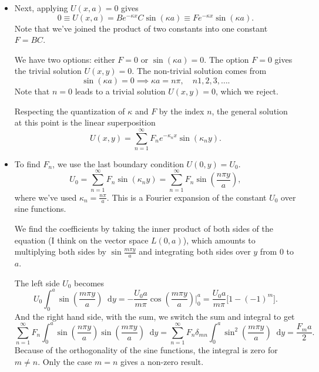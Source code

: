 \documentclass[11pt, a4paper]{article}
\newcommand{\diff}{\mathop{}\!\mathrm{d}} %
\begin{document}
\begin{itemize}
\begin{itemize}
		\item Next, applying $ U(x, a) = 0$ gives
		\begin{equation*}
			0 \equiv U(x, a) = Be^{-\kappa x} C \sin (\kappa a) \equiv F e^{-\kappa x} \sin (\kappa a).
		\end{equation*} 
		Note that we've joined the product of two constants into one constant $ F = BC $. 
		
		We have two options: either $ F = 0 $ or $ \sin (\kappa a) = 0$. The option $ F = 0 $ gives the trivial solution $ U(x, y) = 0 $. The non-trivial solution comes from 
		\begin{equation*}
			\sin(\kappa a ) = 0 \implies \kappa a = n \pi, \quad n 1, 2, 3, \ldots.
		\end{equation*}
		Note that $ n = 0 $ leads to a trivial solution $ U(x, y) = 0 $, which we reject.
		
		Respecting the quantization of $ \kappa $ and $ F $ by the index $ n $, the general solution at this point is the linear superposition
		\begin{equation*}
			U(x, y) = \sum_{n=1}^{\infty} F_{n} e^{-\kappa_{n}x}\sin(\kappa_{n}y).
		\end{equation*}
		
		\item To find $ F_{n} $, we use the last boundary condition $ U(0, y) = U_{0} $.
		\begin{equation*}
			U_{0} = \sum_{n=1}^{\infty} F_{n} \sin(\kappa_{n}y) = \sum_{n=1}^{\infty} F_{n} \sin(\frac{n\pi y}{a}),
		\end{equation*}
		where we've used $ \kappa_{n} = \frac{n\pi}{a} $. This is a Fourier expansion of the constant $ U_{0} $ over sine functions. 
		
		We find the coefficients by taking the inner product of both sides of the equation (I think on the vector space $ L(0, a) $), which amounts to multiplying both sides by $ \sin \frac{m\pi y}{a} $ and integrating both sides over $ y $ from $ 0 $ to $ a $. 
		
		The left side $ U_{0} $ becomes
		\begin{equation*}
			U_{0} \int_{0}^{a}\sin(\frac{m\pi y}{a}) \diff y = -\frac{U_{0}a}{m \pi} \cos(\frac{m\pi y}{a}) \bigg |_{0}^{a} = \frac{U_{0}a}{m \pi}\big[1 - (-1)^{m}\big].
		\end{equation*}
		And the right hand side, with the sum, we switch the sum and integral to get
		\begin{equation*}
			\sum_{n = 1}^{\infty} F_{n} \int_{0}^{a} \sin(\frac{n\pi y}{a}) \sin(\frac{m\pi y}{a} ) \diff y = \sum_{n = 1}^{\infty} F_{n} \delta_{mn} \int_{0}^{a} \sin^{2}\left (\frac{m\pi y}{a} \right ) \diff y = \frac{F_{m}a}{2}.
		\end{equation*}
		Because of the orthogonality of the sine functions, the integral is zero for $ m \neq n $. Only the case $ m = n $ gives a non-zero result. 
		

\end{itemize}
\end{itemize}
\end{document}
